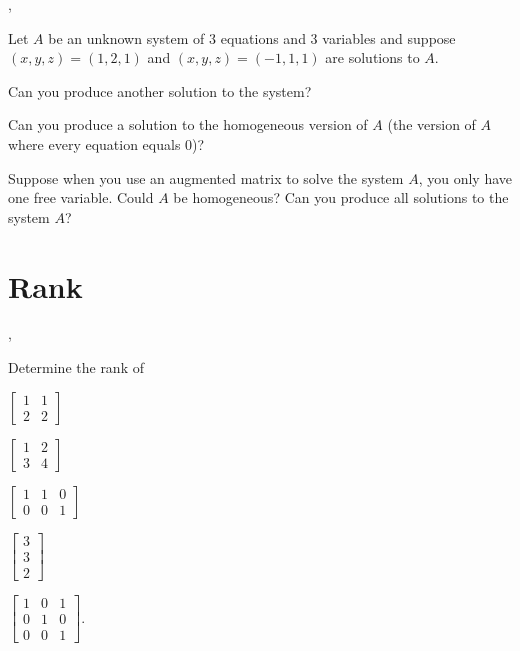 \documentclass[letter]{article}
\newcommand{\mat}[1]{\begin{bmatrix}#1\end{bmatrix}}
\renewcommand{\emph}[1]{{\color{defcolor} \textbf{\textit{##1}}}}
\begin{document}
	\sep

		Let $A$ be an unknown system of $3$ equations and $3$ variables and suppose
		 $(x,y,z)=(1,2,1)$ and
		$(x,y,z)=(-1,1,1)$ are solutions to $A$.
	\begin{Enum}
		\item Can you produce another solution
		to the system?

		\item  Can you
		produce a solution to the homogeneous version of $A$ (the version of $A$ where every
		equation equals 0)?

		\item Suppose when you use an augmented matrix to solve the system $A$, you only have 
		one free variable.  Could $A$ be homogeneous?  Can you produce all solutions to the system $A$?
	\end{Enum}

\newpage
\section*{Rank}

	\sep
	\vspace{-1cm}
	\begin{Enum}
		\item Determine the rank of
		\begin{enumerate*}
			\item $\mat{1&1\\2&2}$
			\item $\mat{1&2\\3&4}$
			\item $\mat{1&1&0\\0&0&1}$
			\item $\mat{3\\3\\2}$
			\item $\mat{1&0&1\\0&1&0\\0&0&1}$.
		\end{enumerate*}
	\end{Enum}
	
\end{document}
